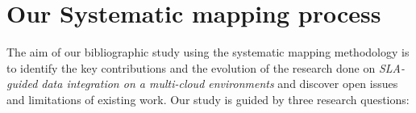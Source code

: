 \section{Our Systematic mapping process}\label{sec:sm}


 





The aim of our bibliographic study using the systematic mapping methodology \cite{SM:Petersen:2008}  is to identify   the key contributions and the evolution of the research done on \textit{SLA-guided
data integration on a multi-cloud environments} and discover open issues and limitations of existing work.    
Our study is guided by  three research questions:

